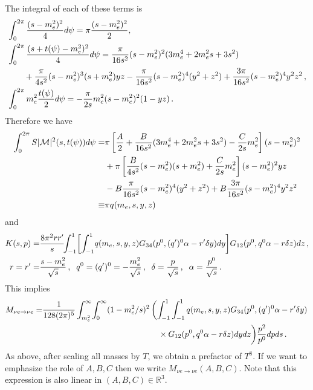  The integral of each of these terms is
 \begin{align}
&\int_0^{2\pi}\frac{(s-m_e^2)^2}{4} d\psi=\pi\frac{(s-m_e^2)^2}{2},\\
&\int_0^{2\pi}\frac{(s+t(\psi)-m_e^2)^2}{4}d\psi=\frac{\pi}{16s^2}(s-m_e^2)^2(3m_e^4+2m_e^2s+3s^2)\notag\\
&\qquad+\frac{\pi}{4s^2}(s-m_e^2)^3(s+m_e^2)yz
-\frac{\pi}{16s^2}(s-m_e^2)^4(y^2+z^2)+\frac{3\pi}{16s^2}(s-m_e^2)^4y^2z^2\,,\notag\\
&\int_0^{2\pi} m_e^2\frac{t(\psi)}{2}d\psi=-\frac{\pi}{2s}m_e^2(s-m_e^2)^2(1-yz)\,.\notag
\end{align}
Therefore we have
\begin{align}
\int_0^{2\pi} S |\mathcal{M}|^2 (s,t(\psi))d\psi=&\pi\left[\frac{A}{2}+\frac{B}{16s^2}(3m_e^4+2m_e^2s+3s^2)-\frac{C}{2s}m_e^2\right](s-m_e^2)^2\notag\\
&+\pi\left[\frac{B}{4s^2}(s-m_e^2)(s+m_e^2)+\frac{C}{2s}m_e^2\right](s-m_e^2)^2yz\notag\\
&-B\frac{\pi}{16s^2}(s-m_e^2)^4(y^2+z^2)+B\frac{3\pi}{16s^2}(s-m_e^2)^4y^2z^2\notag\\
\equiv& \pi q(m_e,s,y,z)
\end{align}
and
\begin{align}
K(s,p)=&\frac{8\pi^2 rr^{\prime}}{s}\!\!\int_{-1}^1 \!\left[\int_{-1}^1 \! q(m_e,s,y,z) G_{34}(p^0,(q^{\prime})^0\alpha-r^{\prime}\delta y) dy\right] \!G_{12}(p^0,q^0\alpha-r\delta z)dz\,,\\
r=r^{\prime}=&\frac{s-m_e^2}{\sqrt{s}}\,,\hspace{2mm} q^0=(q^{\prime})^0=-\frac{m_e^2}{\sqrt{s}}\,,\hspace{2mm} \delta=\frac{p}{\sqrt{s}}\,,\hspace{2mm}  \alpha=\frac{p^0}{\sqrt{s}}\,.\notag
\end{align}
This implies
\begin{align}
M_{\nu e\rightarrow\nu e}=&\frac{1}{128(2\pi)^5 }\int_{m_e^2}^\infty\!\int_0^\infty (1-m_e^2/s)^2\left(\int_{-1}^1 \int_{-1}^1 q(m_e,s,y,z) G_{34}(p^0,(q^{\prime})^0\alpha-r^{\prime}\delta y)\right.\\
&\hspace{50mm}\times  G_{12}(p^0,q^0\alpha-r\delta z)dydz\bigg)\frac{ p^2}{p^0}dpds\,.\notag
\end{align}
As above, after scaling all masses by $T$, we obtain a prefactor of $T^8$. If we want to emphasize the role of $A,B,C$ then we write $M_{\nu e\rightarrow\nu e}(A,B,C)$.  Note that this expression is also linear in $(A,B,C)\in\mathbb{R}^3$.



